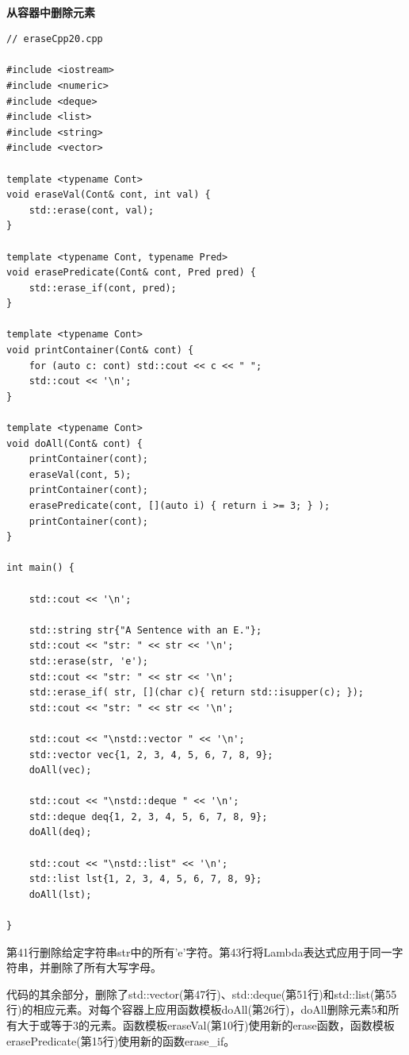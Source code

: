 \hspace*{\fill} \\ %
\noindent
\textbf{从容器中删除元素}
\begin{lstlisting}[style=styleCXX]
// eraseCpp20.cpp

#include <iostream>
#include <numeric>
#include <deque>
#include <list>
#include <string>
#include <vector>

template <typename Cont>
void eraseVal(Cont& cont, int val) {
	std::erase(cont, val);
}

template <typename Cont, typename Pred>
void erasePredicate(Cont& cont, Pred pred) {
	std::erase_if(cont, pred);
}

template <typename Cont>
void printContainer(Cont& cont) {
	for (auto c: cont) std::cout << c << " ";
	std::cout << '\n';
}

template <typename Cont>
void doAll(Cont& cont) {
	printContainer(cont);
	eraseVal(cont, 5);
	printContainer(cont);
	erasePredicate(cont, [](auto i) { return i >= 3; } );
	printContainer(cont);
}

int main() {

	std::cout << '\n';
	
	std::string str{"A Sentence with an E."};
	std::cout << "str: " << str << '\n';
	std::erase(str, 'e');
	std::cout << "str: " << str << '\n';
	std::erase_if( str, [](char c){ return std::isupper(c); });
	std::cout << "str: " << str << '\n';
	
	std::cout << "\nstd::vector " << '\n';
	std::vector vec{1, 2, 3, 4, 5, 6, 7, 8, 9};
	doAll(vec);
	
	std::cout << "\nstd::deque " << '\n';
	std::deque deq{1, 2, 3, 4, 5, 6, 7, 8, 9};
	doAll(deq);
	
	std::cout << "\nstd::list" << '\n';
	std::list lst{1, 2, 3, 4, 5, 6, 7, 8, 9};
	doAll(lst);

}
\end{lstlisting}

第41行删除给定字符串str中的所有'e'字符。第43行将Lambda表达式应用于同一字符串，并删除了所有大写字母。

代码的其余部分，删除了std::vector(第47行)、std::deque(第51行)和std::list(第55行)的相应元素。对每个容器上应用函数模板doAll(第26行)，doAll删除元素5和所有大于或等于3的元素。函数模板eraseVal(第10行)使用新的erase函数，函数模板erasePredicate(第15行)使用新的函数erase\_if。

